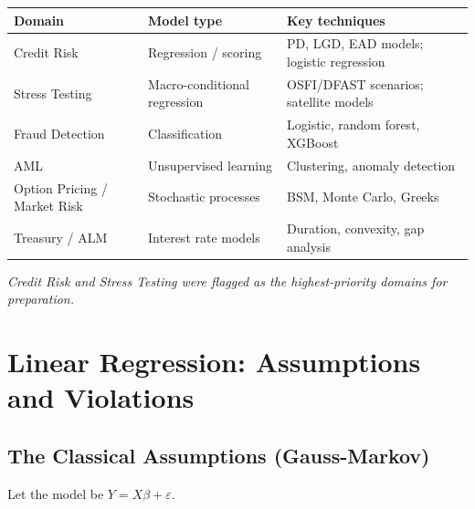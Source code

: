\documentclass[11pt, a4paper]{article}
\begin{document}
\begin{center}
\begin{tabular}{lll}
\toprule
\textbf{Domain} & \textbf{Model type} & \textbf{Key techniques} \\
\midrule
Credit Risk & Regression / scoring & PD, LGD, EAD models; logistic regression \\
Stress Testing & Macro-conditional regression & OSFI/DFAST scenarios; satellite models \\
Fraud Detection & Classification & Logistic, random forest, XGBoost \\
AML & Unsupervised learning & Clustering, anomaly detection \\
Option Pricing / Market Risk & Stochastic processes & BSM, Monte Carlo, Greeks \\
Treasury / ALM & Interest rate models & Duration, convexity, gap analysis \\
\bottomrule
\end{tabular}
\end{center}

\textit{Credit Risk and Stress Testing were flagged as the highest-priority domains for preparation.}

\section{Linear Regression: Assumptions and Violations}

\subsection{The Classical Assumptions (Gauss-Markov)}

Let the model be $Y = X\beta + \varepsilon$.
\end{document}

